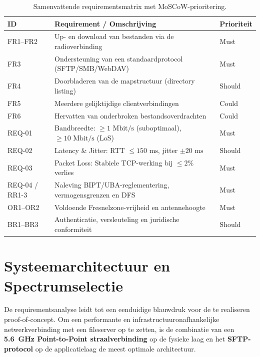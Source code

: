 \begin{table}[h]
  \centering
  \small
  \begin{tabular}{p{2.2cm}p{7.8cm}p{2.2cm}}
    \toprule
    \textbf{ID} & \textbf{Requirement / Omschrijving} & \textbf{Prioriteit} \\
    \midrule
    FR1--FR2 & Up- en download van bestanden via de radioverbinding & Must \\
    FR3 & Ondersteuning van een standaardprotocol (SFTP/SMB/WebDAV) & Must \\
    FR4 & Doorbladeren van de mapstructuur (directory listing) & Should \\
    FR5 & Meerdere gelijktijdige clientverbindingen & Could \\
    FR6 & Hervatten van onderbroken bestandsoverdrachten & Could \\
    REQ-01 & Bandbreedte: $\ge 1\text{ Mbit/s}$ (suboptimaal), $\ge 10\text{ Mbit/s}$ (LoS) & Must \\
    REQ-02 & Latency \& Jitter: RTT $\le 150\text{ ms}$, jitter $\pm 20\text{ ms}$ & Should \\
    REQ-03 & Packet Loss: Stabiele TCP-werking bij $\le 2\%$ verlies & Must \\
    REQ-04 / RR1-3 & Naleving BIPT/UBA-reglementering, vermogensgrenzen en DFS & Must \\
    OR1--OR2 & Voldoende Fresnelzone-vrijheid en antennehoogte & Must \\
    BR1--BR3 & Authenticatie, versleuteling en juridische conformiteit & Should \\
    \bottomrule
  \end{tabular}
  \caption{Samenvattende requirementsmatrix met MoSCoW-prioritering.}
  \label{tab:requirementsmatrix}
\end{table}

\section{Systeemarchitectuur en Spectrumselectie}
\label{sec:req-tussentijdse-conclusie}

De requirementsanalyse leidt tot een eenduidige blauwdruk voor de te realiseren proof-of-concept. Om een performante en infrastructuuronafhankelijke netwerkverbinding met een fileserver op te zetten, is de combinatie van een \textbf{5.6~GHz Point-to-Point straalverbinding} op de fysieke laag en het \textbf{SFTP-protocol} op de applicatielaag de meest optimale architectuur.

